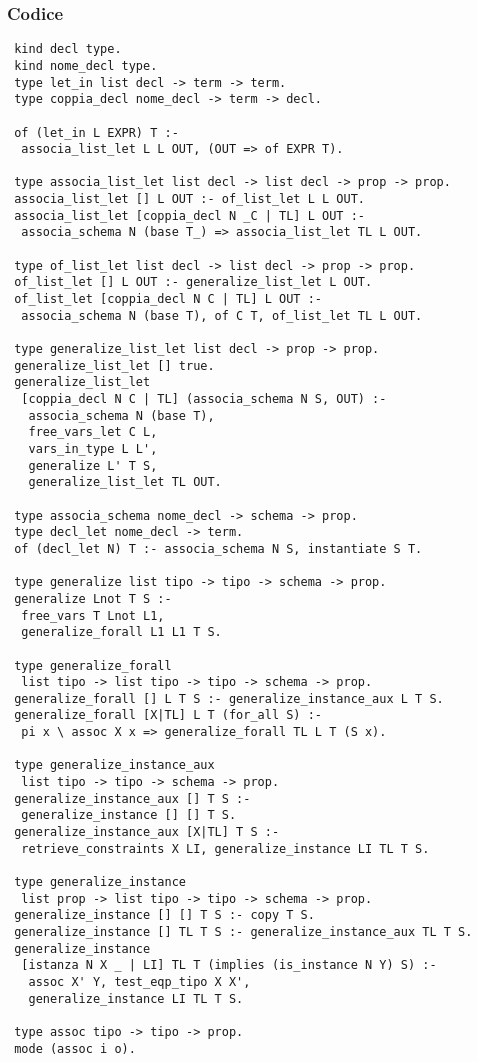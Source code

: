 \documentclass[12pt,a4paper,openright,twoside]{report}
\begin{document}
\subsubsection{Codice}
\begin{verbatim}
 kind decl type.
 kind nome_decl type.
 type let_in list decl -> term -> term.
 type coppia_decl nome_decl -> term -> decl.
 
 of (let_in L EXPR) T :-
  associa_list_let L L OUT, (OUT => of EXPR T).

 type associa_list_let list decl -> list decl -> prop -> prop.
 associa_list_let [] L OUT :- of_list_let L L OUT.
 associa_list_let [coppia_decl N _C | TL] L OUT :-
  associa_schema N (base T_) => associa_list_let TL L OUT.

 type of_list_let list decl -> list decl -> prop -> prop.
 of_list_let [] L OUT :- generalize_list_let L OUT.
 of_list_let [coppia_decl N C | TL] L OUT :-
  associa_schema N (base T), of C T, of_list_let TL L OUT.

 type generalize_list_let list decl -> prop -> prop.
 generalize_list_let [] true.
 generalize_list_let
  [coppia_decl N C | TL] (associa_schema N S, OUT) :-
   associa_schema N (base T),
   free_vars_let C L,
   vars_in_type L L',
   generalize L' T S,
   generalize_list_let TL OUT.

 type associa_schema nome_decl -> schema -> prop.
 type decl_let nome_decl -> term.
 of (decl_let N) T :- associa_schema N S, instantiate S T.

 type generalize list tipo -> tipo -> schema -> prop.
 generalize Lnot T S :-
  free_vars T Lnot L1,
  generalize_forall L1 L1 T S.

 type generalize_forall
  list tipo -> list tipo -> tipo -> schema -> prop.
 generalize_forall [] L T S :- generalize_instance_aux L T S.
 generalize_forall [X|TL] L T (for_all S) :-
  pi x \ assoc X x => generalize_forall TL L T (S x).

 type generalize_instance_aux
  list tipo -> tipo -> schema -> prop.
 generalize_instance_aux [] T S :-
  generalize_instance [] [] T S.
 generalize_instance_aux [X|TL] T S :-
  retrieve_constraints X LI, generalize_instance LI TL T S.

 type generalize_instance
  list prop -> list tipo -> tipo -> schema -> prop.
 generalize_instance [] [] T S :- copy T S.
 generalize_instance [] TL T S :- generalize_instance_aux TL T S.
 generalize_instance
  [istanza N X _ | LI] TL T (implies (is_instance N Y) S) :-
   assoc X' Y, test_eqp_tipo X X',
   generalize_instance LI TL T S.

 type assoc tipo -> tipo -> prop.
 mode (assoc i o).
\end{verbatim}
\end{document}
